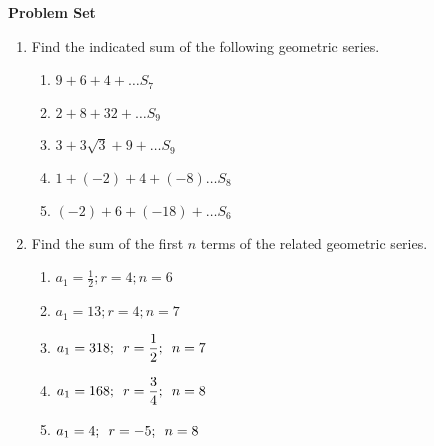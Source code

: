 \textbf{Problem Set }

\vspce

\begin{enumerate}[label = \Alph*. ]
\item Find the indicated sum of the following geometric series.   
  
\begin{enumerate}[label = \arabic*. ]


	\item \hspce $9+6+4+\ldots S_7$ 
	\item \hspce $2+8+32+\ldots S_{9}$
	\item \hspce $3+3\sqrt{3}+9+\ldots S_{9}$
	\item \hspce $1+(-2)+4+(-8)\ldots S_8$
	\item \hspce $(-2)+6+(-18)+\ldots S_6$ 
	

\end{enumerate}

\vspce

\item Find the sum of the first $n$ terms of the related geometric series. 

\begin{enumerate}[label = \arabic*. ]


\item \hspce $\displaystyle a_1=\frac{1}{2}; r=4; n=6 $
\item \hspce $\displaystyle a_1=13; r=4; n=7 $ 
\item \hspce $\displaystyle a_1=318; \hspace{0.5em} r=\frac{1}{2};\hspace{0.5em} n=7 $
\item \hspce $\displaystyle a_1=168;\hspace{0.5em} r=\frac{3}{4};\hspace{0.5em} n=8 $
\item \hspce $\displaystyle a_1=4;\hspace{0.5em} r=-5; \hspace{0.5em} n=8 $


\end{enumerate}
\end{enumerate}